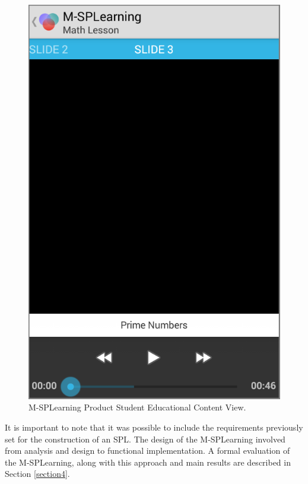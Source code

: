\begin{figure}[!ht]
\centering
\includegraphics[scale=0.265]{figures/section3/MSPLStudentView}
\caption{M-SPLearning Product Student Educational Content View.}
\label{figureMSPLStudentView}
\end{figure}

It is important to note that it was possible to include the requirements previously set for the construction of an SPL. The design of the M-SPLearning involved from analysis and design to functional implementation. A formal evaluation of the M-SPLearning, along with this approach and main results are described in Section \ref{section4}.